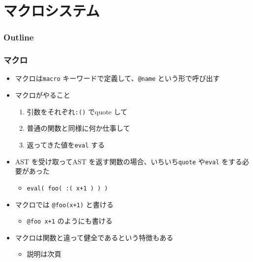 \section{マクロシステム}
\begin{frame}
  \frametitle{Outline}
  \tableofcontents[currentsection]
\end{frame}

\begin{frame}[containsverbatim]
\frametitle{マクロ}
\begin{itemize}
  \item マクロは\verb|macro| キーワードで定義して、\verb|@name| という形で呼び出す
  \item マクロがやること
    \begin{enumerate}
      \item 引数をそれぞれ\verb|:()| でquote して
      \item 普通の関数と同様に何か仕事して
      \item 返ってきた値を\verb|eval| する
    \end{enumerate}
  \item AST を受け取ってAST を返す関数の場合、いちいち\verb|quote| や\verb|eval| をする必要があった
    \begin{itemize}
      \item \verb|eval( foo( :( x+1 ) ) ) |
    \end{itemize}
  \item マクロでは \verb|@foo(x+1)| と書ける
    \begin{itemize}
      \item \verb|@foo x+1| のようにも書ける
    \end{itemize}
  \item マクロは関数と違って健全であるという特徴もある
    \begin{itemize}
      \item 説明は次頁
    \end{itemize}
\end{itemize}
\end{frame}

